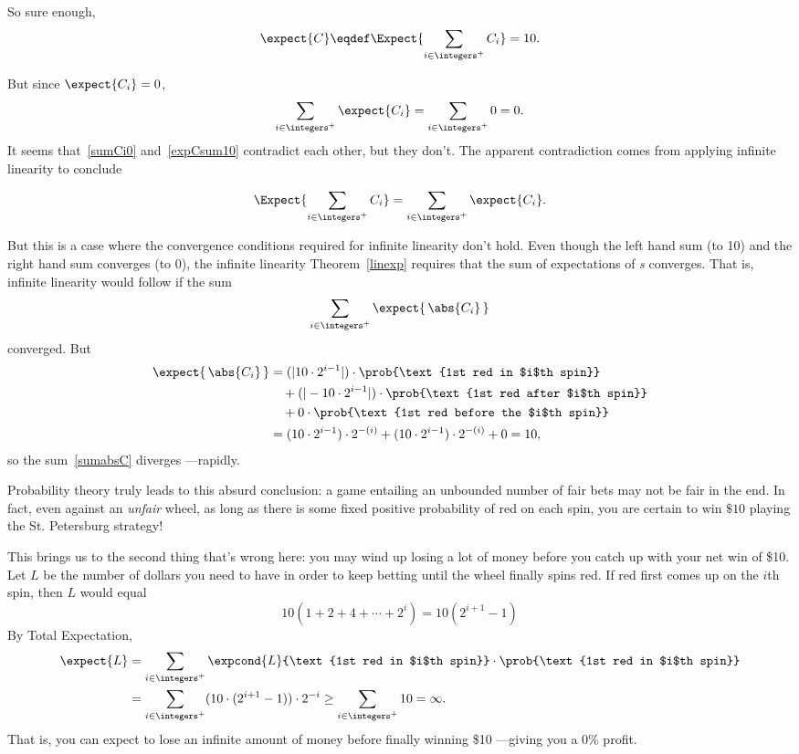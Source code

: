 So sure enough,
\begin{equation}\label{expCsum10}
\expect{C} \eqdef \Expect{\sum_{i \in \integers^+} C_i} = 10.
\end{equation}

But since $\expect{C_i} = 0$,
\begin{equation}\label{sumCi0}
\sum_{i \in \integers^+} \expect{C_i} = \sum_{i \in \integers^+} 0 = 0.
\end{equation}
It seems that~\eqref{sumCi0} and~\eqref{expCsum10} contradict each
other, but they don't.  The apparent contradiction comes from applying
infinite linearity to conclude
\begin{falseclm*}
\[
\Expect{\sum_{i \in \integers^+} C_i} = \sum_{i \in \integers^+} \expect{C_i}.
\]
\end{falseclm*}
But this is a case where the convergence conditions required for
infinite linearity don't hold.  Even though the left hand sum
 (to 10) and the right hand sum converges (to 0), the
infinite linearity Theorem~\eqref{linexp} requires that the sum of
expectations of \emph{s} converges.  That is,
infinite linearity would follow if the sum
\begin{equation}\label{sumabsC}
\sum_{i \in \integers^+} \expect{\, \abs{C_i}\, }
\end{equation}
converged.  But
\begin{align*}
\expect{\, \abs{C_i}\, }
  & = (|10 \cdot 2^{i-1}|) \cdot \prob{\text{1st red in $i$th spin}}\\
  &\quad  + (|-10 \cdot 2^{i-1}|) \cdot \prob{\text{1st red after $i$th spin}}\\
  &\quad  + 0 \cdot \prob{\text{1st red before the $i$th spin}}\\
  & = (10 \cdot 2^{i-1}) \cdot 2^{-(i)}
       + (10 \cdot 2^{i-1}) \cdot 2^{-(i)}
       + 0 = 10,
\end{align*}
so the sum~\eqref{sumabsC} diverges ---rapidly.

Probability theory truly leads to this absurd conclusion: a game
entailing an unbounded number of fair bets may not be fair in the end.
In fact, even against an \emph{unfair} wheel, as long as there is some
fixed positive probability of red on each spin, you are certain to win
$\$10$ playing the St. Petersburg strategy!

This brings us to the second thing that's wrong here: you may wind up
losing a lot of money before you catch up with your net win of \$10.
Let $L$ be the number of dollars you need to have in order to keep
betting until the wheel finally spins red.  If red first comes up on
the $i$th spin, then $L$ would equal
\[
10(1 + 2 + 4 + \cdots + 2^i) = 10(2^{i+1}- 1)
\]
By Total Expectation,
\begin{align*}
\expect{L} 
& = \sum_{i \in \integers^+} \expcond{L}{\text{1st red in $i$th spin}} \cdot
       \prob{\text{1st red in $i$th spin}}\\
& = \sum_{i \in \integers^+} (10 \cdot (2^{i+1} -1)) \cdot 2^{-i}
       \geq \sum_{i \in \integers^+} 10 = \infty.
\end{align*}
That is, you can expect to lose an infinite amount of money before
finally winning \$10 ---giving you a 0\% profit.

